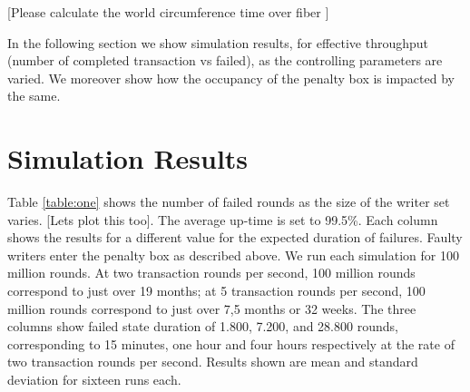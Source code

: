 \documentclass[10pt]{article}
\begin{document}

[Please calculate the world circumference time over fiber ]




In the following section we show simulation results, for effective throughput (number of completed transaction vs failed), as the controlling parameters are varied. We moreover show how the occupancy of the penalty box is impacted by the same.




\section{Simulation Results}
\label{simulation-res}
Table \ref{table:one} shows the number of failed rounds as the size of the writer set varies. [Lets plot this too]. The average up-time is set to 99.5\%. Each column shows the results for a different value for the expected duration of failures. Faulty writers enter the penalty box as described above. We run each simulation for 100 million rounds. At two transaction rounds per second, 100 million rounds correspond to just over 19 months; at 5 transaction rounds per second, 100 million rounds correspond to just over 7,5 months or 32 weeks. The three columns show failed state duration of 1.800, 7.200, and 28.800 rounds, corresponding to 15 minutes, one hour and four hours respectively at the rate of two transaction rounds per second. Results shown are mean and standard deviation for sixteen runs each.
\end{document}
